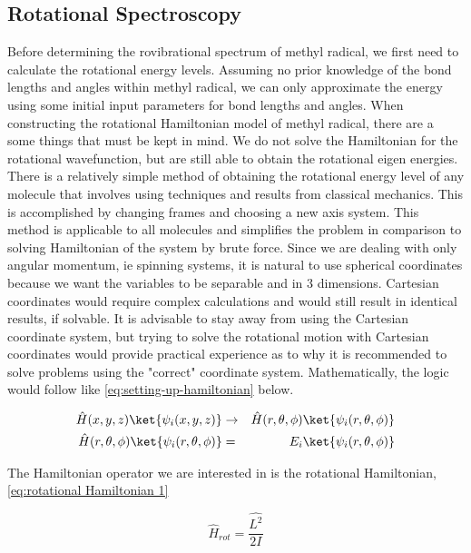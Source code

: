 \documentclass[11pt,a4paper]{book}
\begin{document}
		\subsection{Rotational Spectroscopy}
			\label{subsec:Rotational Spectroscopy}
			Before determining the rovibrational spectrum of methyl radical, we first need to calculate the rotational energy levels. Assuming no prior knowledge of the bond lengths and angles within methyl radical, we can only approximate the energy using some initial input parameters for bond lengths and angles. When constructing the rotational Hamiltonian model of methyl radical, there are a some things that must be kept in mind. We do not solve the Hamiltonian for the rotational wavefunction, but are still able to obtain the rotational eigen energies. There is a relatively simple method of obtaining the rotational energy level of any molecule that involves using techniques and results from classical mechanics. This is accomplished by changing frames and choosing a new axis system. This method is applicable to all molecules and simplifies the problem in comparison to solving Hamiltonian of the system by brute force.	Since we are dealing with only angular momentum, ie spinning systems, it is natural to use spherical coordinates because we want the variables to be separable and in 3 dimensions. Cartesian coordinates would require complex calculations and would still result in identical results, if solvable. It is advisable to stay away from using the Cartesian coordinate system, but trying to solve the rotational motion with Cartesian coordinates would provide practical experience as to why it is recommended to solve problems using the "correct" coordinate system. Mathematically, the logic would follow like \autoref{eq:setting-up-hamiltonian} below.
			
			\begin{eqnarray}
				\label{eq:setting-up-hamiltonian}
				\hat{H} (x, y , z) \ket{\psi_i(x, y , z)} 
				&\rightarrow&
				\hat{H} (r,\theta, \phi) \ket{\psi_i(r,\theta, \phi)}
				\\
				\hat{H} (r,\theta, \phi) \ket{\psi_i(r,\theta, \phi)} 
				&=& 
				E_i\ket{\psi_i(r,\theta, \phi)}
			\end{eqnarray}	
			
			The Hamiltonian operator we are interested in is the rotational Hamiltonian, \autoref{eq:rotational Hamiltonian 1}
			
			\begin{equation}
				\label{eq:rotational Hamiltonian 1}
				\hat{H}_{rot} = \dfrac{\hat{L^2}}{2I}
			\end{equation}
			
\end{document}
